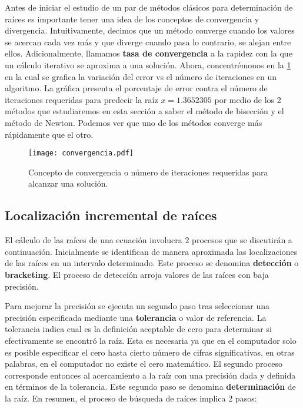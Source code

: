 Antes de iniciar el estudio de un par de métodos clásicos para 
determinación de raíces es importante tener una idea de los conceptos de 
convergencia y divergencia. Intuitivamente, decimos que un método converge 
cuando los valores se acercan cada vez más y que diverge cuando pasa lo 
contrario, se alejan entre ellos. Adicionalmente, llamamos \textbf{tasa de 
convergencia} a la rapidez con la que un cálculo iterativo se aproxima a una 
solución. Ahora, concentrémonos en la \cref{fig:raizconverge} en la cual se 
grafica la variación del error vs el número de iteraciones en un algoritmo. 
La gráfica presenta el porcentaje de error contra el número de iteraciones 
requeridas para predecir la raíz $x=1.3652305$ por medio de los 2 métodos que 
estudiaremos en esta sección a saber el método de bisección y el método de 
Newton. Podemos ver que uno de los métodos converge más rápidamente que el otro.

\begin{figure}[H]
  \centering
  \texttt{[image: convergencia.pdf]}
  \caption{Concepto de convergencia o número de iteraciones requeridas para
  alcanzar una solución.}
  \label{fig:raizconverge}
\end{figure}
	

\subsection{Localización incremental de raíces}

El cálculo de las raíces de una ecuación involucra 2 procesos que se discutirán 
a continuación. Inicialmente se identifican de manera aproximada las 
localizaciones de las raíces en un intervalo determinado. Este proceso se 
denomina \textbf{detección} o \textbf{bracketing}. El proceso de detección 
arroja valores de las raíces con baja precisión.

Para mejorar la precisión se ejecuta un segundo paso tras seleccionar una 
precisión especificada mediante una \textbf{tolerancia} o valor de referencia. 
La tolerancia indica cual es la definición aceptable de cero para determinar si 
efectivamente se encontró la raíz. Esta es necesaria ya que en el computador 
solo es posible especificar el cero hasta cierto número de cifras 
significativas, en otras palabras, en el computador no existe el cero 
matemático. El segundo proceso corresponde entonces al acercamiento a la raíz 
con una precisión dada y definida en términos de la tolerancia. Este segundo 
paso se denomina \textbf{determinación} de la raíz. En resumen, el 
proceso de búsqueda de raíces implica 2 pasos:

